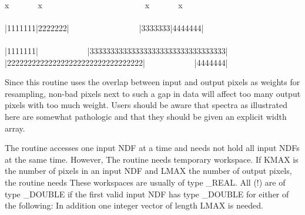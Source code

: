 {{{\ssttt
\parbox{146mm}{
\hspace*{\fill} \\ 
\phantom{~~~~~~~~~}x~~~~~~~x~~~~~~~~~~~~~~~~~~~~~~~~~x~~~~~~~x \\
\hspace*{\fill} \\ 
\phantom{~~~~~}|1111111|2222222|~~~~~~~~~~~~~~~~~|3333333|4444444| \\
\hspace*{\fill} \\ 
\phantom{~~~~~}|1111111|~~~~~~~~~~~~|333333333333333333333333333333333| \\ 
|222222222222222222222222222222222|~~~~~~~~~~~~|4444444|
}}

\vspace{5mm}

      Since this routine uses the overlap between input and output
      pixels as weights for resampling, non-bad pixels next to such a
      gap in data will affect too many output pixels with too much
      weight.
      Users should be aware that spectra as illustrated here are
      somewhat pathologic and that they should be given an explicit
      width array.

      The routine accesses one input NDF at a time and needs not hold
      all input NDFs at the same time. However, The routine needs
      temporary workspace. If KMAX is the number of pixels in an input
      NDF and LMAX the number of output pixels, the routine needs
      These workspaces are usually of type \_REAL. All (!) are of type
      \_DOUBLE if the first valid input NDF has type \_DOUBLE for either
      of the following:
      In addition one integer vector of length LMAX is needed.

}}

